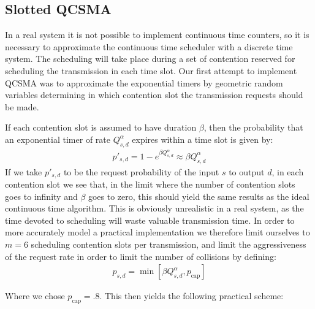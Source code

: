 \documentclass{IEEEtran}%
\begin{document}
\subsection{Slotted QCSMA} \label{naive_qcsma}


In a real system it is not possible to implement continuous time counters, so it is necessary to approximate the continuous time scheduler with a discrete time system.  The scheduling will take place during a set of contention reserved for scheduling the transmission in each time slot.  Our first attempt to implement QCSMA was to approximate the exponential timers by geometric random variables determining in which contention slot the transmission requests should be made.

If each contention slot is assumed to have duration $\beta$, then the probability that an exponential timer of rate $Q_{s,d}^\alpha$ expires within a time slot is given by:
\begin{align}
p'_{s,d} =1-e^{\beta Q_{s,d}^\alpha} \approx \beta Q_{s,d}^\alpha
\end{align}
If we take $p'_{s,d}$ to be the request probability of the input $s$ to output $d$, in each contention slot we see that, in the limit where the number of contention slots goes to infinity and $\beta$ goes to zero, this should yield the same results as the ideal continuous time algorithm.  This is obviously unrealistic in a real system, as the time devoted to scheduling will waste valuable transmission time.  In order to more accurately model a practical implementation we therefore limit ourselves to $m=6$ scheduling contention slots per transmission, and limit the aggressiveness of the request rate in order to limit the number of collisions by defining:
\begin{align}  \label{geo_p}
p_{s,d} =\min \left[ \beta Q_{s,d}^\alpha,p_{\text{cap}}\right]
\end{align}

Where we chose $p_{\text{cap}}=.8$.  This then yields the following practical scheme:\\
\end{document}
